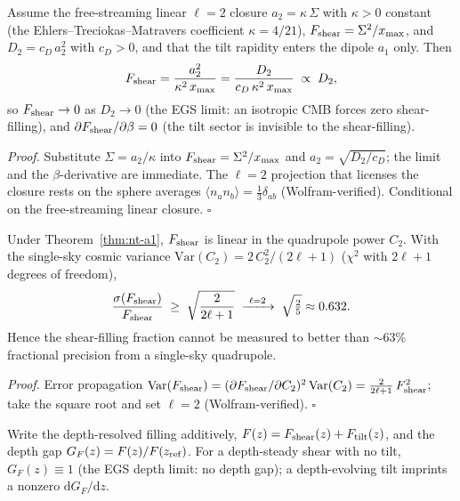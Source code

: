 \begin{theorem}\label{thm:nt-a1}
Assume the free-streaming linear $\ell=2$ closure $a_2 = \kappa\,
\Sigma$ with $\kappa>0$ constant (the Ehlers--Treciokas--Matravers
coefficient $\kappa = 4/21$), $F_{\rm shear} = \Sigma^2/x_{\max}$,
and $D_2 = c_D\,a_2^2$ with $c_D>0$, and that the tilt rapidity
enters the dipole $a_1$ only.  Then
\begin{equation}
F_{\rm shear} = \frac{a_2^2}{\kappa^2\,x_{\max}}
  = \frac{D_2}{c_D\,\kappa^2\,x_{\max}} \;\propto\; D_2,
\end{equation}
so $F_{\rm shear}\to 0$ as $D_2\to 0$ (the EGS limit: an isotropic
CMB forces zero shear-filling), and $\partial F_{\rm shear}/\partial
\beta = 0$ (the tilt sector is invisible to the shear-filling).
\end{theorem}

\noindent\emph{Proof.} Substitute $\Sigma = a_2/\kappa$ into $F_{\rm
shear}=\Sigma^2/x_{\max}$ and $a_2=\sqrt{D_2/c_D}$; the limit and
the $\beta$-derivative are immediate.  The $\ell=2$ projection that
licenses the closure rests on the sphere averages $\langle
n_a n_b\rangle = \tfrac13\delta_{ab}$ (Wolfram-verified).
Conditional on the free-streaming linear closure. $\square$

\begin{theorem}\label{thm:nt-a3}
Under Theorem~\ref{thm:nt-a1}, $F_{\rm shear}$ is linear in the
quadrupole power $C_2$.  With the single-sky cosmic variance
$\mathrm{Var}(C_2) = 2\,C_2^2/(2\ell+1)$ ($\chi^2$ with $2\ell+1$
degrees of freedom),
\begin{equation}
\frac{\sigma(F_{\rm shear})}{F_{\rm shear}}
  \;\ge\; \sqrt{\frac{2}{2\ell+1}}
  \;\xrightarrow{\ \ell=2\ }\; \sqrt{\tfrac{2}{5}} \approx 0.632 .
\end{equation}
Hence the shear-filling fraction cannot be measured to better than
$\sim 63\%$ fractional precision from a single-sky quadrupole.
\end{theorem}

\noindent\emph{Proof.} Error propagation $\mathrm{Var}(F_{\rm
shear}) = (\partial F_{\rm shear}/\partial C_2)^2\,\mathrm{Var}(C_2)
= \tfrac{2}{2\ell+1}\,F_{\rm shear}^2$; take the square root and set
$\ell=2$ (Wolfram-verified). $\square$

\begin{theorem}\label{thm:nt-b3}
Write the depth-resolved filling additively, $F(z) = F_{\rm
shear}(z) + F_{\rm tilt}(z)$, and the depth gap $G_F(z) =
F(z)/F(z_{\rm ref})$.  For a depth-steady shear with no tilt,
$G_F(z)\equiv 1$ (the EGS depth limit: no depth gap); a
depth-evolving tilt imprints a nonzero $\mathrm{d}G_F/\mathrm{d}z$.
\end{theorem}

